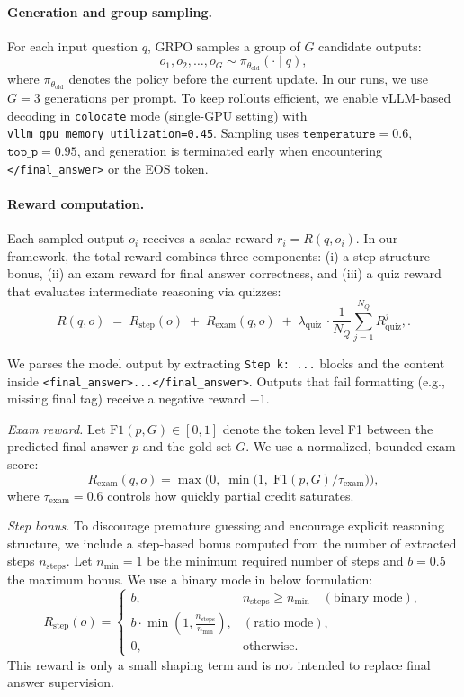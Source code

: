 \documentclass[12pt]{report}
\begin{document}
\paragraph{Generation and group sampling.}
For each input question \(q\), GRPO samples a group of \(G\) candidate outputs:
\[
o_1, o_2, \dots, o_G \sim \pi_{\theta_{\text{old}}}(\cdot \mid q),
\]
where \(\pi_{\theta_{\text{old}}}\) denotes the policy before the current update.
In our runs, we use \(G=3\) generations per prompt.
To keep rollouts efficient, we enable vLLM-based decoding in \texttt{colocate}
mode (single-GPU setting) with \texttt{vllm\_gpu\_memory\_utilization=0.45}.
Sampling uses \(\texttt{temperature}=0.6\), \(\texttt{top\_p}=0.95\), and generation is terminated early when
encountering \texttt{</final\_answer>} or the EOS token.

\paragraph{Reward computation.}
Each sampled output \(o_i\) receives a scalar reward \(r_i = R(q,o_i)\).
In our framework, the total reward combines three components:
(i) a step structure bonus, (ii) an exam reward for final answer correctness, and (iii) a quiz reward that evaluates intermediate reasoning via quizzes:
\[
R(q,o) \;=\; R_{\text{step}}(o)\;+\;R_{\text{exam}}(q,o)\;+\;\lambda_{\text{quiz}}\,
\cdot\frac{1}{N_Q} \sum_{j=1}^{N_Q} R^{j}_{\text{quiz}},.
\]

We parses the model output by extracting
\texttt{Step k: ...} blocks and the content inside
\texttt{<final\_answer>...</final\_answer>}. Outputs that fail formatting (e.g., missing final tag) receive a negative  reward $-1$.

\emph{Exam reward.}
Let \(\mathrm{F1}(p,G)\in[0,1]\) denote the token level F1 between the predicted final
answer \(p\) and the gold set \(G\). We use a normalized, bounded exam score:
\[
R_{\text{exam}}(q,o)
=\max\!\Big(0,\; \min\!\big(1,\; \mathrm{F1}(p,G) / \tau_{\text{exam}}\big)\Big),
\]
where \(\tau_{\text{exam}}=0.6\) controls how quickly partial credit saturates.

\emph{Step bonus.}
To discourage premature guessing and encourage explicit reasoning structure,
we include a step-based bonus computed from the number of extracted steps
\(n_{\text{steps}}\). Let \(n_{\min}=1\) be the minimum required number of steps
and \(b=0.5\) the maximum bonus. We use a binary mode in below formulation:
\[
R_{\text{step}}(o)=
\begin{cases}
b, & n_{\text{steps}}\ge n_{\min} \quad(\text{binary mode}),\\
b\cdot \min\!\left(1,\frac{n_{\text{steps}}}{n_{\min}}\right),
& (\text{ratio mode}),\\
0, & \text{otherwise}.
\end{cases}
\]
This reward is only a small shaping term and is not intended to replace final
answer supervision.
\end{document}
